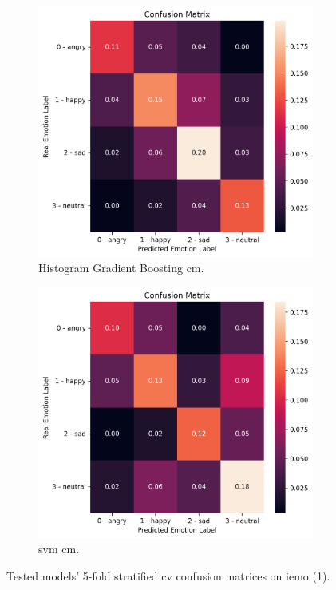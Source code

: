 \begin{figure}[H]
	\newline
	\begin{subfigure}{.5\textwidth}
		\centering
		\includegraphics[width=.9\linewidth]{figs/appendix/feature_selection/HistCM.png}
		\caption{Histogram Gradient Boosting \ac{cm}.}
	\end{subfigure}%
	\begin{subfigure}{.5\textwidth}
		\centering
		\includegraphics[width=.9\linewidth]{figs/appendix/feature_selection/SVMCM.png}
		\caption{\ac{svm} \ac{cm}.}
	\end{subfigure}
	\caption{Tested models' 5-fold stratified \ac{cv} confusion matrices on \ac{iemo} (1).}
\end{figure}

